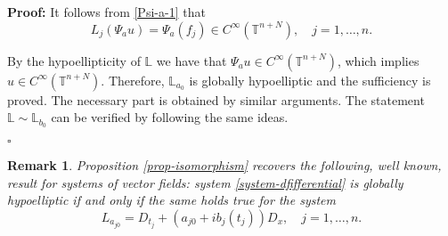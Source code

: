 \documentclass[12pt]{elsarticle}
\newtheorem{remark}[theorem]{Remark}
\numberwithin{equation}{section}
\newenvironment{proof}[1][\noindent \textbf{Proof: }]{#1}{ \hfill $\square$ \vspace{2mm}}
\begin{document}
\begin{proof}
It follows from \eqref{Psi-a-1} that 
$$
L_j (\Psi_a u)  = \Psi_a (f_j) \in C^{\infty}(\mathbb{T}^{n+N}), \quad j = 1, \ldots, n.
$$

By the hypoellipticity of $\mathbb{L}$ we have that $\Psi_a u \in C^{\infty}(\mathbb{T}^{n+N})$, which implies $u \in C^{\infty}(\mathbb{T}^{n+N})$. Therefore,  $\mathbb{L}_{a_0}$  is globally hypoelliptic and the sufficiency is proved. The necessary part is obtained by similar arguments.  The statement $\mathbb{L} \sim \mathbb{L}_{b_0}$ can be verified by following the same ideas.

\end{proof}


\begin{remark}
Proposition \ref{prop-isomorphism} recovers the following, well known,
result for systems of  vector fields: system \eqref{system-dfifferential} is globally hypoelliptic if and only if the same holds true for the system
\begin{equation*}
L_{a_{j0}} = D_{t_j} + (a_{j0}+ ib_j(t_j)) D_x,\quad   j=1,\ldots,n.
\end{equation*}
\end{remark}










\end{document}
